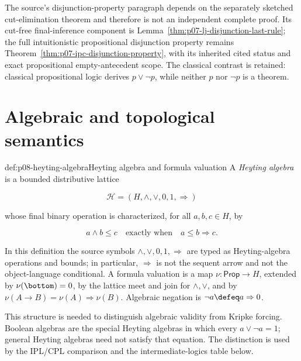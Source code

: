 The source's disjunction-property paragraph depends on the separately
sketched cut-elimination theorem and therefore is not an independent complete
proof.  Its cut-free final-inference component is
Lemma~\ref{thm:p07-lj-disjunction-last-rule}; the full intuitionistic
propositional disjunction property remains
Theorem~\ref{thm:p07-ipc-disjunction-property}, with its inherited cited
status and exact propositional empty-antecedent scope.
The classical contrast is retained: classical propositional logic derives
\(p\lor\neg p\), while neither \(p\) nor \(\neg p\) is a theorem.


\section{Algebraic and topological semantics}

\begin{hbdefinition}{def:p08-heyting-algebra}{Heyting algebra and formula valuation}
A \emph{Heyting algebra} is a bounded distributive lattice

\[
  \mathcal H=(H,\wedge,\vee,0,1,\Rightarrow)
\]

whose final binary operation is characterized, for all \(a,b,c\in H\), by

\[
  a\wedge b\leq c
  \quad\text{exactly when}\quad
  a\leq b\Rightarrow c.
\]

In this definition the source symbols \(\wedge,\vee,0,1,\Rightarrow\) are
typed as Heyting-algebra operations and bounds; in particular,
\(\Rightarrow\) is not the sequent arrow and not the object-language
conditional.  A formula valuation is a map
\(\nu:\mathsf{Prop}\to H\), extended by
\(\nu(\bottom)=0\), by the lattice meet and join for
\(\land,\lor\), and by
\(\nu(A\to B)=\nu(A)\Rightarrow\nu(B)\).
Algebraic negation is
\(\neg a\defeq a\Rightarrow0\).

This structure is needed to distinguish algebraic validity from Kripke
forcing.  Boolean algebras are the special Heyting algebras in which every
\(a\vee\neg a=1\); general Heyting
algebras need not satisfy that equation.  The distinction is used by the
IPL/CPL comparison and the intermediate-logics table below.
\end{hbdefinition}

